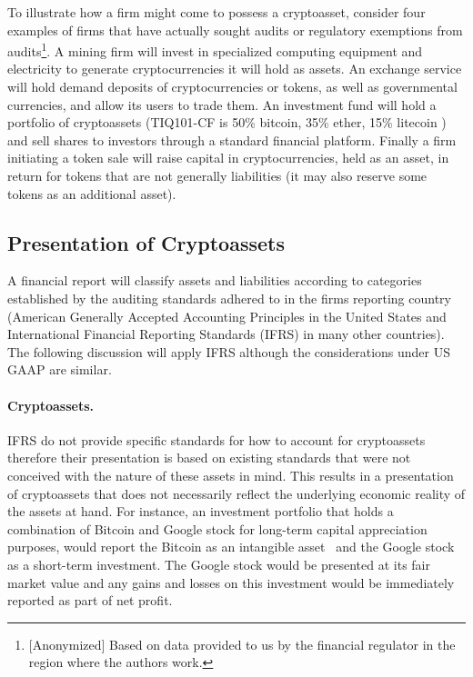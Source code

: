 To illustrate how a firm might come to possess a cryptoasset, consider four examples of firms that have actually sought audits or regulatory exemptions from audits\footnote{[Anonymized] Based on data provided to us by the financial regulator in the region where the authors work.}. A mining firm will invest in specialized computing equipment and electricity to generate cryptocurrencies it will hold as assets. An exchange service will hold demand deposits of cryptocurrencies or tokens, as well as governmental currencies, and allow its users to trade them. An investment fund will hold a portfolio of cryptoassets (\eg TIQ101-CF is 50\% bitcoin, 35\% ether, 15\% litecoin ) and sell shares to investors through a standard financial platform. Finally a firm initiating a token sale will raise capital in cryptocurrencies, held as an asset, in return for tokens that are not generally liabilities (it may also reserve some tokens as an additional asset).


\subsection{Presentation of Cryptoassets}
A financial report will classify assets and liabilities according to categories established by the auditing standards adhered to in the firm\textquotesingle s reporting country (American Generally Accepted Accounting Principles in the United States and International Financial Reporting Standards (IFRS) in many other countries). The following discussion will apply IFRS although the considerations under US GAAP are similar. 


\paragraph{Cryptoassets.} IFRS do not provide specific standards for how to account for cryptoassets therefore their presentation is based on existing standards that were not conceived with the nature of these assets in mind. This results in a presentation of cryptoassets that does not necessarily reflect the underlying economic reality of the assets at hand. For instance, an investment portfolio that holds a combination of Bitcoin and Google stock for long-term capital appreciation purposes, would report the Bitcoin as an intangible asset~\cite{RCGTIFRsCrypto2018} and the Google stock as a short-term investment. The Google stock would be presented at its fair market value and any gains and losses on this investment would be immediately reported as part of net profit. 

